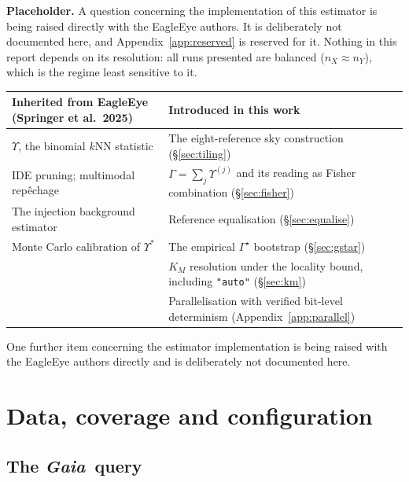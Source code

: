 \documentclass[11pt,a4paper]{article}
\newcommand{\Ups}{\Upsilon}                  %
\newcommand{\Gam}{\Gamma}                    %
\newcommand{\Ups}{\Upsilon}
\newcommand{\Gam}{\Gamma}
\newcommand{\Gstar}{\Gamma^{\star}}
\newcommand{\Gaia}{\textit{Gaia}}
\newenvironment{callout}%
  {\par\smallskip
   \setlength{\fboxrule}{0.6pt}\setlength{\fboxsep}{7pt}%
   \def\FrameCommand{\fcolorbox{calloutrule}{calloutbg}}%
   \MakeFramed{\advance\hsize-\width \FrameRestore}}%
  {\endMakeFramed\par\smallskip}
\begin{document}
\begin{callout}
\textbf{Placeholder.} A question concerning the implementation of this estimator is being raised
directly with the EagleEye authors. It is deliberately not documented here, and
Appendix~\ref{app:reserved} is reserved for it. Nothing in this report depends on its resolution:
all runs presented are balanced ($n_X \approx n_Y$), which is the regime least sensitive to it.
\end{callout}


\begin{table}[h]
\centering\small
\begin{tabular}{@{}p{}p{}@{}}
\toprule
\textbf{Inherited from EagleEye (Springer et al.\ 2025)} & \textbf{Introduced in this work}\\
\midrule
$\Ups$, the binomial $k$NN statistic & The eight-reference sky construction (\S\ref{sec:tiling})\\
IDE pruning; multimodal rep\^echage  & $\Gam = \sum_j \Ups^{(j)}$ and its reading as Fisher
                                       combination (\S\ref{sec:fisher})\\
The injection background estimator   & Reference equalisation (\S\ref{sec:equalise})\\
Monte Carlo calibration of $\Ups^*$  & The empirical $\Gstar$ bootstrap (\S\ref{sec:gstar})\\
                                     & $K_M$ resolution under the locality bound, including
                                       \texttt{"auto"} (\S\ref{sec:km})\\
                                     & Parallelisation with verified bit-level determinism
                                       (Appendix~\ref{app:parallel})\\
\bottomrule
\end{tabular}
\end{table}

One further item concerning the estimator implementation is being raised with the EagleEye authors
directly and is deliberately not documented here.

\section{Data, coverage and configuration}
\label{sec:data}

\subsection{The \Gaia\ query}
\end{document}
